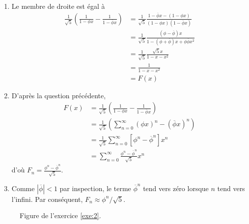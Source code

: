 {\begin{enumerate}
		\item
		Le membre de droite est égal à
		\begin{align*}
			 \frac{1}{\sqrt5} \left( \frac1{1-\phi x} - \frac1{1-\overline{\phi}x} \right) &= 
			 \frac{1}{\sqrt5} \frac{1-\overline{\phi}x - (1-\phi x)}{(1-\phi x)(1-\overline{\phi}x)}  \\
			 &= \frac{1}{\sqrt5} \frac{(\phi-\overline{\phi})x}{1 - (\phi + \overline{\phi})x + \phi\overline{\phi} x^2}  \\
			 &= \frac{1}{\sqrt5} \frac{\sqrt5x}{1 -x - x^2}  \\
			 &= \frac{1}{1-x-x^2} \\
			 &= F(x)
		\end{align*}
		
		\item
		D'après la question précédente,
		\begin{align*}
			F(x) &= \frac{1}{\sqrt5} \left( \frac1{1-\phi x} - \frac1{1-\overline{\phi}x} \right) \\
			&= \frac{1}{\sqrt5} \left( \sum_{n=0}^{\infty} (\phi x)^n - (\overline{\phi} x)^n \right) \\
			&= \frac{1}{\sqrt5} \sum_{n=0}^{\infty} \left[\phi^n - \overline{\phi}^n \right] x^n \\
			&= \sum_{n=0}^{\infty} \frac{\phi^n - \overline{\phi}^n}{\sqrt5} x^{n}
		\end{align*}
		d'où $F_{n} = \frac{\phi^n - \overline{\phi}^n}{\sqrt5}$.
	
		\item
		Comme $|\overline{\phi}| < 1$ par inspection, le terme $\overline{\phi}^n$ tend vers zéro lorsque $n$ tend vers l'infini.
		Par conséquent, $F_n \approx \phi^n / \sqrt5$.
	\end{enumerate}
}





\newpage


\begin{figure}
\centering
\begin{subfigure}{.5\textwidth}
\end{subfigure}
\caption{Figure de l'exercice \ref{exe:2}.}
\label{fig:2}
\end{figure}



